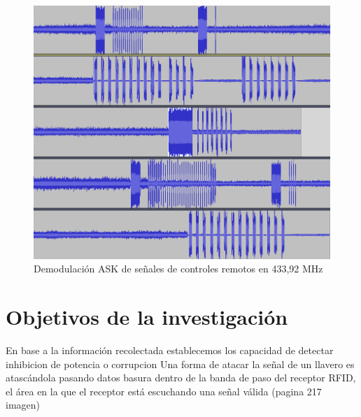 \documentclass[12pt]{report}
\begin{document}
\begin{figure}[htb]
	\centering
	\includegraphics[scale=0.4]{llaves.png}
	\caption{Demodulación ASK de señales de controles remotos en 433,92 MHz}
	\label{llaves}
\end{figure}



\section{Objetivos de la investigación}
En base a la información recolectada establecemos los
capacidad de detectar inhibicion de potencia o corrupcion
Una forma de atacar la señal de un llavero es atascándola pasando datos basura dentro de la banda de paso del receptor RFID, 
el área en la que el receptor está escuchando una señal válida (pagina 217 imagen)




\pagebreak
\end{document}
